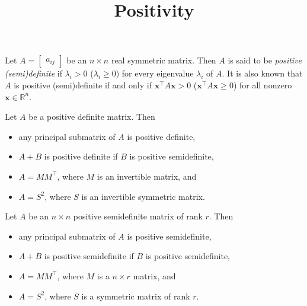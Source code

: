 \documentclass{article}
\title{Positivity}
\date{\vspace{-1cm}}
\newcommand{\trans}{^\top}
\newcommand{\bx}{\mathbf{x}}
\theoremstyle{definition}
\begin{document}
\maketitle
\large

Let $A = \begin{bmatrix} a_{ij} \end{bmatrix}$ be an $n\times n$ real symmetric matrix.  Then $A$ is said to be \emph{positive (semi)definite} if $\lambda_i>0$ ($\lambda_i\geq 0)$ for every eigenvalue $\lambda_i$ of $A$.  It is also known that $A$ is positive (semi)definite if and only if $\bx\trans A\bx > 0$ ($\bx\trans A\bx \geq 0$) for all nonzero $\bx\in\mathbb{R}^n$.

Let $A$ be a positive definite matrix.  Then 
\begin{itemize}
\item any principal submatrix of $A$ is positive definite, 
\item $A + B$ is positive definite if $B$ is positive semidefinite,  
\item $A = MM\trans$, where $M$ is an invertible matrix, and 
\item $A = S^2$, where $S$ is an invertible symmetric matrix.
\end{itemize}

Let $A$ be an $n\times n$ positive semidefinite matrix of rank $r$.  Then 
\begin{itemize}
\item any principal submatrix of $A$ is positive semidefinite, 
\item $A + B$ is positive semidefinite if $B$ is positive semidefinite,  
\item $A = MM\trans$, where $M$ is a $n\times r$ matrix, and 
\item $A = S^2$, where $S$ is a symmetric matrix of rank $r$.
\end{itemize}
  
\end{document}
